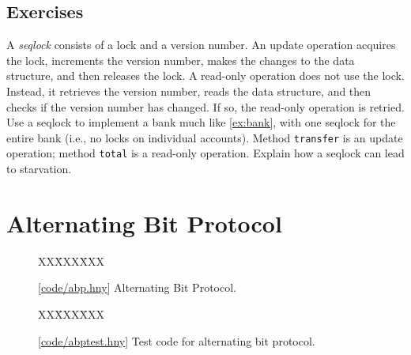 \documentclass{report}
\newcommand{\harmonysource}[1]{
\begin{tabbing}
XX\=XXX\=XXX\kill
    
\end{tabbing}
}
\newcommand{\harmonylink}[1]{%
[\href{https://harmony.cs.cornell.edu/#1}{\underline{#1}}]%
}
\newenvironment{code}{
\tcolorbox
}{
\endtcolorbox
}
\begin{document}

\section*{Exercises}
\begin{problems}
\item A \emph{seqlock}
%
consists of a lock and a version number.
An update operation acquires the lock, increments the version number, makes the
changes to the data structure, and then releases the lock.  A read-only operation
does not use the lock.  Instead, it retrieves the version number,
reads the data structure, and then checks if the
version number has changed.  If so, the read-only operation is retried.
Use a seqlock to implement a bank much like \autoref{ex:bank}, with
one seqlock for the entire bank (i.e., no locks on individual accounts).
Method \texttt{transfer} is an update operation; method \texttt{total} is a
read-only operation.  Explain how a seqlock can lead to starvation.
\end{problems}

\chapter{Alternating Bit Protocol}
\label{ch:abp}
%
%
%

\begin{figure}
\begin{code}
\harmonysource{abp}
\end{code}
\caption{\harmonylink{code/abp.hny} Alternating Bit Protocol.}
\label{fig:abp}
\end{figure}

\begin{figure}
\begin{code}
\harmonysource{abptest}
\end{code}
\caption{\harmonylink{code/abptest.hny} Test code for alternating bit protocol.}
\label{fig:abptest}
\end{figure}
\end{document}
